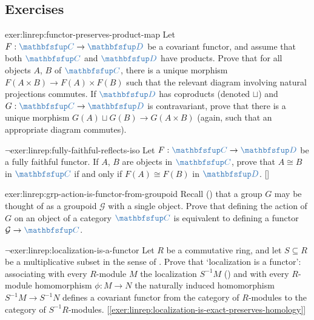 \subsection*{Exercises}

\begin{exer}{}{exer:linrep:functor-preserves-product-map}
  Let $F : \categ{C} \to \categ{D}$ be a covariant functor, and assume
  that both $\categ{C}$ and $\categ{D}$ have products. Prove that for
  all objects $A$, $B$ of $\categ{C}$, there is a unique morphism
  $F(A \times B) \to F(A) \times F(B)$ such that the relevant diagram
  involving natural projections commutes. If $\categ{D}$ has
  coproducts (denoted $\sqcup$) and $G : \categ{C} \to \categ{D}$ is
  contravariant, prove that there is a unique morphism
  $G(A) \sqcup G(B) \to G(A \times B)$ (again, such that an
  appropriate diagram commutes).
\end{exer}

\begin{exer}{$\lnot$}{exer:linrep:fully-faithful-reflects-iso}
  Let $F : \categ{C} \to \categ{D}$ be a fully faithful functor. If
  $A$, $B$ are objects in $\categ{C}$, prove that $A \cong B$ in
  $\categ{C}$ if and only if $F(A) \cong F(B)$ in $\categ{D}$.
  []
\end{exer}

\begin{exer}{}{exer:linrep:grp-action-is-functor-from-groupoid}
  Recall () that a group $G$
  may be thought of as a groupoid $\mathcal{G}$ with a single
  object. Prove that defining the action of $G$ on an object of a
  category $\categ{C}$ is equivalent to defining a functor
  $\mathcal{G} \to \categ{C}$.
\end{exer}

\begin{exer}{$\lnot$}{exer:linrep:localization-is-a-functor}
  Let $R$ be a commutative ring, and let $S \subseteq R$ be a
  multiplicative subset in the sense of
  . Prove that
  `localization is a functor': associating with every $R$-module $M$
  the localization $S^{-1}M$
  () and with every $R$-module
  homomorphism $\phi : M \to N$ the naturally induced homomorphism
  $S^{-1}M \to S^{-1}N$ defines a covariant functor from the category
  of $R$-modules to the category of $S^{-1}R$-modules.
  [\ref{exer:linrep:localization-is-exact-preserves-homology}]
\end{exer}

